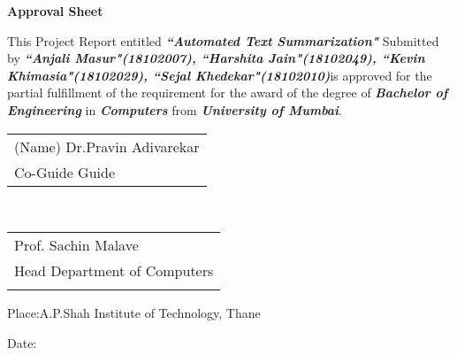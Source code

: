 \newpage
\thispagestyle{empty}
\vspace*{0.2cm}
\vspace{1cm}
\begin{center}
 \large\textbf{Approval Sheet}
\end{center}
\vspace{1cm}

\par This Project Report entitled \textbf{\textit{``Automated Text Summarization"}} Submitted by
\textbf{\textit{``Anjali Masur"(18102007), ``Harshita Jain"(18102049), ``Kevin Khimasia"(18102029), ``Sejal Khedekar"(18102010)}}is approved for the partial fulfillment of the requirement for the award of the degree of \textbf{\textit{Bachelor of Engineering} }in\textbf{ \textit{Computers}} from \textbf{\textit{University of Mumbai}}.


\vspace{40mm}
\begin{tabular}{@{}l@{}}
(Name)\hspace{85mm}       Dr.Pravin Adivarekar\\
Co-Guide \hspace{85mm}    Guide\\

\end{tabular}
\vspace{40mm}\\
\hfill
\begin{tabular}{@{}l@{}}
\hspace{55mm} Prof. Sachin Malave\\
\hspace{55mm}Head Department of Computers \\

\vspace{5mm}
\end{tabular}

\vspace{40mm}
Place:A.P.Shah Institute of Technology, Thane\par
\vspace{1mm}
Date:
\clearpage